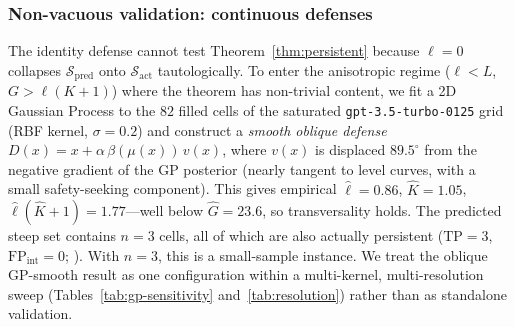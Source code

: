 \documentclass[11pt]{article}
\begin{document}
\begin{table}[h]
\centering
\small
\caption{Empirical $\hat L$ and $\hat G$ computed with two distance
metrics on the same $82$-cell saturated archive. The $2$D metric is
the paper's main estimator (normalized MAP-Elites grid coordinates);
the $768$-d metric uses
\texttt{sentence-transformers/all-mpnet-base-v2} embeddings of the
cell prompts with pairwise-max-normalized Euclidean distance. The two
estimates agree to within $21\%$, so the $2$D projection is not
materially distorting the Lipschitz constants.}
\label{tab:higher-dim-lipschitz}

\end{table}

\subsubsection{Non-vacuous validation: continuous defenses}
\label{sec:gp-instance}

The identity defense cannot test Theorem~\ref{thm:persistent}
because $\ell = 0$ collapses
$\mathcal{S}_{\text{pred}}$ onto $\mathcal{S}_{\text{act}}$
tautologically. To enter the anisotropic regime
($\ell < L$, $G > \ell(K{+}1)$) where the theorem has non-trivial
content, we fit a 2D Gaussian Process to the $82$ filled cells of
the saturated \texttt{gpt-3.5-turbo-0125} grid (RBF kernel,
$\sigma = 0.2$) and construct a \emph{smooth oblique defense}
$D(x) = x + \alpha\,\beta(\mu(x))\,v(x)$, where $v(x)$ is
displaced $89.5^{\circ}$ from the negative gradient of the GP
posterior (nearly tangent to level curves, with a small
safety-seeking component). This gives empirical $\hat\ell = 0.86$,
$\hat K = 1.05$, $\hat\ell(\hat K{+}1) = 1.77$---well below
$\hat G = 23.6$, so transversality holds. The predicted steep set
contains $n = 3$ cells, all of which are also actually persistent
($\text{TP} = 3$, $\text{FP}_{\text{int}} = 0$;
). With $n = 3$, this is a
small-sample instance. We treat the oblique GP-smooth result as
one configuration within a multi-kernel, multi-resolution sweep
(Tables~\ref{tab:gp-sensitivity} and~\ref{tab:resolution}) rather
than as standalone validation.
\end{document}
